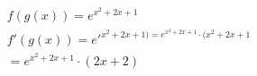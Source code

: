 \documentclass[preview]{standalone}
\begin{document}
\begin{align*}
f(g(x))=e^{x^2+2x+1}\\ f'(g(x))=e'^{x^2+2x+1)=e^{x^2+2x+1} \cdot (x^2+2x+1}\\ =e^{x^2+2x+1} \cdot (2x+2)
\end{align*}
\end{document}
